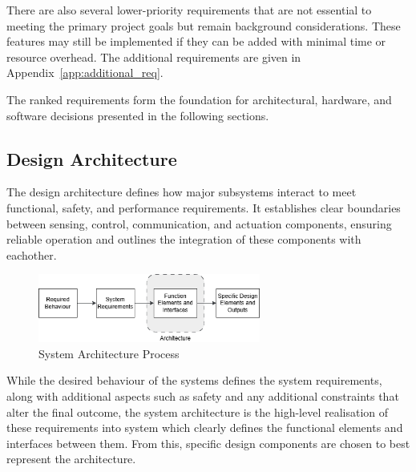 There are also several lower-priority requirements that are not essential to meeting the primary project goals but remain background considerations. These features may still be implemented if they can be added with minimal time or resource overhead. The additional requirements are given in Appendix~\ref{app:additional_req}.

The ranked requirements form the foundation for architectural, hardware, and software decisions presented in the following sections.


\pagebreak
\subsection{Design Architecture}

The design architecture defines how major subsystems interact to meet functional, safety, and performance requirements. It establishes clear boundaries between sensing, control, communication, and actuation components, ensuring reliable operation and outlines the integration of these components with eachother.

\begin{figure}[H]
    \centering
    \captionsetup{justification=centering, margin=1cm}
    \includegraphics[width=0.65\textwidth]{img/arch-process.PNG}
    \caption{System Architecture Process}
    \label{fig:arch-process}
\end{figure}

While the desired behaviour of the systems defines the system requirements, along with additional aspects such as safety and any additional constraints that alter the final outcome, the system architecture is the high-level realisation of these requirements into system which clearly defines the functional elements and interfaces between them. From this, specific design components are chosen to best represent the architecture. 

